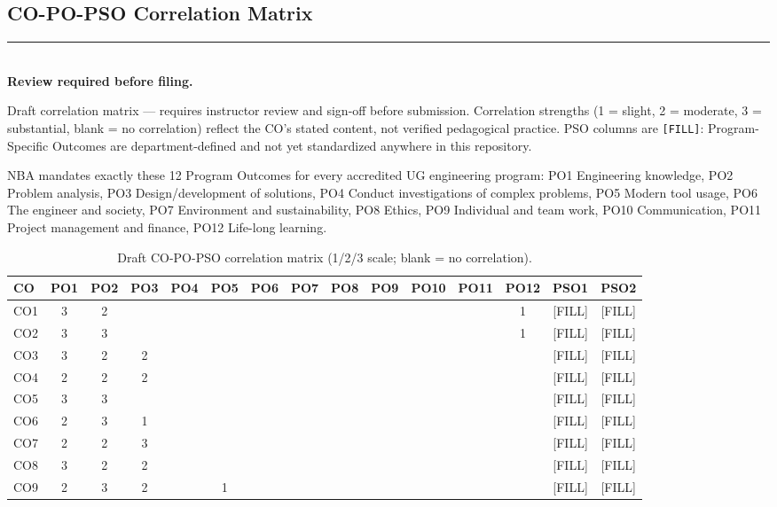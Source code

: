 \documentclass[11pt]{article}
\newenvironment{noticebox}{%
  \par\noindent\begin{minipage}{\linewidth}\vspace{0.4em}
  \textcolor{negative}{\rule{\linewidth}{1.2pt}}\\[0.3em]
  \textbf{\textcolor{negative}{Review required before filing.}}\ \itshape
}{%
  \end{minipage}\vspace{0.6em}\par
}
\begin{document}
\clearpage
\begin{landscape}
\section{CO-PO-PSO Correlation Matrix}
\label{sec:matrix}

\begin{noticebox}
Draft correlation matrix --- requires instructor review and sign-off before submission. Correlation strengths (1 = slight, 2 = moderate, 3 = substantial, blank = no correlation) reflect the CO's stated content, not verified pedagogical practice. PSO columns are \texttt{[FILL]}: Program-Specific Outcomes are department-defined and not yet standardized anywhere in this repository.
\end{noticebox}

NBA mandates exactly these 12 Program Outcomes for every accredited UG engineering program: PO1 Engineering knowledge, PO2 Problem analysis, PO3 Design/development of solutions, PO4 Conduct investigations of complex problems, PO5 Modern tool usage, PO6 The engineer and society, PO7 Environment and sustainability, PO8 Ethics, PO9 Individual and team work, PO10 Communication, PO11 Project management and finance, PO12 Life-long learning.

\begin{table}[h]
\centering
\small
\setlength{\tabcolsep}{4pt}
\begin{tabular}{@{}l cccccccccccc|cc@{}}
\toprule
CO & PO1 & PO2 & PO3 & PO4 & PO5 & PO6 & PO7 & PO8 & PO9 & PO10 & PO11 & PO12 & PSO1 & PSO2 \\
\midrule
CO1 & 3 & 2 &  &  &  &  &  &  &  &  &  & 1 & [FILL] & [FILL] \\
CO2 & 3 & 3 &  &  &  &  &  &  &  &  &  & 1 & [FILL] & [FILL] \\
CO3 & 3 & 2 & 2 &  &  &  &  &  &  &  &  &   & [FILL] & [FILL] \\
CO4 & 2 & 2 & 2 &  &  &  &  &  &  &  &  &   & [FILL] & [FILL] \\
CO5 & 3 & 3 &  &  &  &  &  &  &  &  &  &   & [FILL] & [FILL] \\
CO6 & 2 & 3 & 1 &  &  &  &  &  &  &  &  &   & [FILL] & [FILL] \\
CO7 & 2 & 2 & 3 &  &  &  &  &  &  &  &  &   & [FILL] & [FILL] \\
CO8 & 3 & 2 & 2 &  &  &  &  &  &  &  &  &   & [FILL] & [FILL] \\
CO9 & 2 & 3 & 2 &  & 1 &  &  &  &  &  &  &   & [FILL] & [FILL] \\
\bottomrule
\end{tabular}
\caption{Draft CO-PO-PSO correlation matrix (1/2/3 scale; blank = no correlation).}
\label{tab:co-po-matrix}
\end{table}

\end{landscape}
\clearpage
\end{document}
